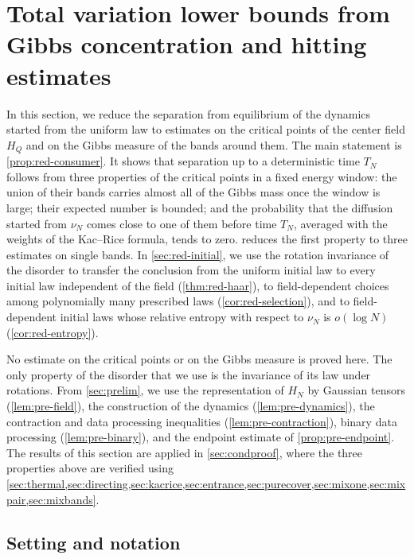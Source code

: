 \chapter{Total variation lower bounds from Gibbs concentration and hitting estimates}\label{sec:reduction}

In this section, we reduce the separation from equilibrium of the dynamics started from the uniform law to estimates on the critical points of the center field $H_Q$ and on the Gibbs measure of the bands around them. The main statement is \cref{prop:red-consumer}. It shows that separation up to a deterministic time $T_N$ follows from three properties of the critical points in a fixed energy window: the union of their bands carries almost all of the Gibbs mass once the window is large; their expected number is bounded; and the probability that the diffusion started from $\nu_N$ comes close to one of them before time $T_N$, averaged with the weights of the Kac--Rice formula, tends to zero.  reduces the first property to three estimates on single bands. In \cref{sec:red-initial}, we use the rotation invariance of the disorder to transfer the conclusion from the uniform initial law to every initial law independent of the field (\cref{thm:red-haar}), to field-dependent choices among polynomially many prescribed laws (\cref{cor:red-selection}), and to field-dependent initial laws whose relative entropy with respect to $\nu_N$ is $o(\log N)$ (\cref{cor:red-entropy}).

No estimate on the critical points or on the Gibbs measure is proved here. The only property of the disorder that we use is the invariance of its law under rotations. From \cref{sec:prelim}, we use the representation of $H_N$ by Gaussian tensors (\cref{lem:pre-field}), the construction of the dynamics (\cref{lem:pre-dynamics}), the contraction and data processing inequalities (\cref{lem:pre-contraction}), binary data processing (\cref{lem:pre-binary}), and the endpoint estimate of \cref{prop:pre-endpoint}. The results of this section are applied in \cref{sec:condproof}, where the three properties above are verified using \cref{sec:thermal,sec:directing,sec:kacrice,sec:entrance,sec:purecover,sec:mixone,sec:mixpair,sec:mixbands}.

\section{Setting and notation}\label{sec:red-setting}

